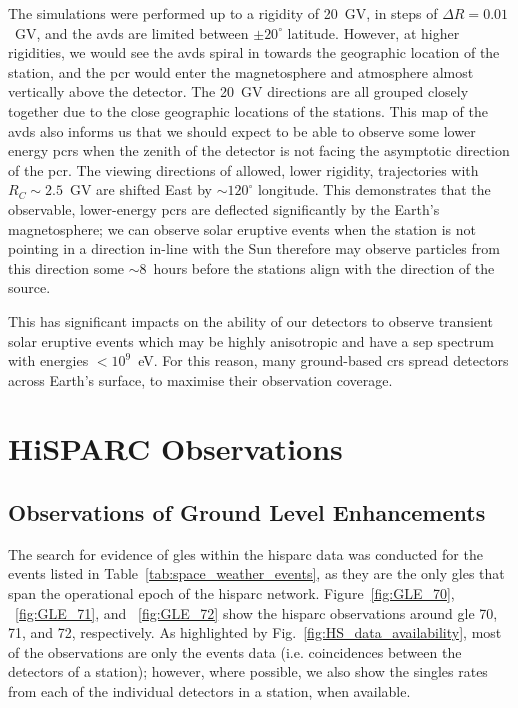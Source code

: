 The simulations were performed up to a rigidity of 20~GV, in steps of $\Delta R = 0.01$~GV, and the \glspl{avd} are limited between $\pm 20^{\circ}$ latitude. However, at higher rigidities, we would see the \glspl{avd} spiral in towards the geographic location of the station, and the \gls{pcr} would enter the magnetosphere and atmosphere almost vertically above the detector. The 20~GV directions are all grouped closely together due to the close geographic locations of the stations. This map of the \glspl{avd} also informs us that we should expect to be able to observe some lower energy \glspl{pcr} when the zenith of the detector is not facing the asymptotic direction of the \gls{pcr}. The viewing directions of allowed, lower rigidity, trajectories with $R_C \sim 2.5$~GV are shifted East by $\sim 120^{\circ}$ longitude. This demonstrates that the observable, lower-energy \glspl{pcr} are deflected significantly by the Earth's magnetosphere; we can observe solar eruptive events when the station is not pointing in a direction in-line with the Sun therefore may observe particles from this direction some $\sim 8$~hours before the stations align with the direction of the source.


This has significant impacts on the ability of our detectors to observe transient solar eruptive events which may be highly anisotropic and have a \gls{sep} spectrum with energies $<10^9$~eV. For this reason, many ground-based \glspl{cr} spread detectors across Earth's surface, to maximise their observation coverage.


\section{HiSPARC Observations}\label{sec:HS_obs}


\subsection{Observations of Ground Level Enhancements}

The search for evidence of \glspl{gle} within the \gls{hisparc} data was conducted for the events listed in Table~\ref{tab:space_weather_events}, as they are the only \glspl{gle} that span the operational epoch of the \gls{hisparc} network. Figure~\ref{fig:GLE_70}, ~\ref{fig:GLE_71}, and ~\ref{fig:GLE_72} show the \gls{hisparc} observations around \gls{gle} 70, 71, and 72, respectively. As highlighted by Fig.~\ref{fig:HS_data_availability}, most of the observations are only the events data (i.e. coincidences between the detectors of a station); however, where possible, we also show the singles rates from each of the individual detectors in a station, when available.

